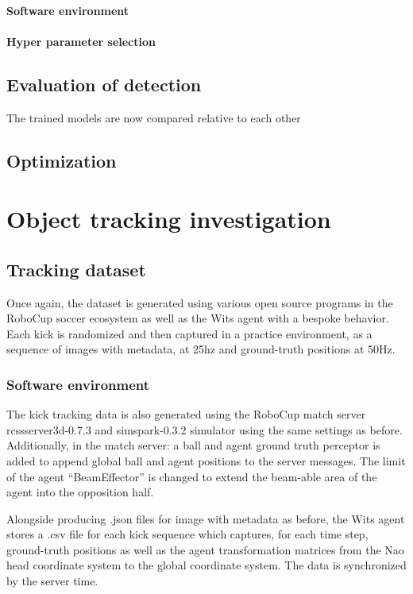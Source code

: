 \documentclass[a4paper,twoside,12pt]{report}
\begin{document}
\subsubsection{Software environment}

\subsubsection{Hyper parameter selection}

\section{Evaluation of detection}

The trained models are now compared relative to each other

\section{Optimization}

\chapter{Object tracking investigation}

\section{Tracking dataset}
Once again, the dataset is generated using various open source programs in the RoboCup soccer ecosystem as well as the Wits agent with a bespoke behavior. Each kick is randomized and then captured in a practice environment, as a sequence of images with metadata, at 25hz and ground-truth positions at 50Hz.

\subsection{Software environment}
The kick tracking data is also generated using the RoboCup match server rcssserver3d-0.7.3 and simspark-0.3.2 simulator using the same settings as before. Additionally, in the match server: a ball and agent ground truth perceptor is added to append global ball and agent positions to the server messages. The limit of the agent ``BeamEffector'' is changed to extend the beam-able area of the agent into the opposition half.

Alongside producing .json files for image with metadata as before, the Wits agent stores a .csv file for each kick sequence which captures, for each time step, ground-truth positions as well as the agent transformation matrices from the Nao head coordinate system to the global coordinate system. The data is synchronized by the server time. 
\end{document}
